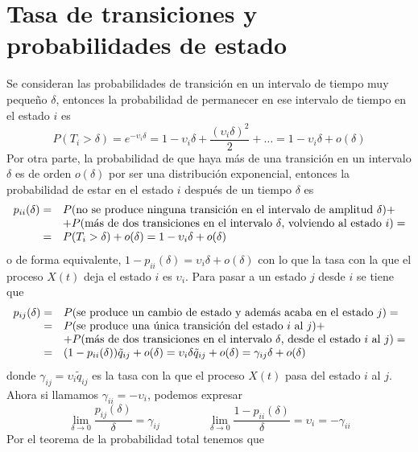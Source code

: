 \section{Tasa de transiciones y probabilidades de estado}
Se consideran las probabilidades de transici\'{o}n en un intervalo de
tiempo muy peque\~{n}o $\delta$, entonces la probabilidad de
permanecer en ese intervalo de tiempo en el estado $i$ es
\[
P(T_i>\delta)=e^{-\upsilon_i \delta}=1-\upsilon_i
\delta+\frac{(\upsilon_i \delta)^2}{2}+\ldots=1-\upsilon_i
\delta+o(\delta)
\]
Por otra parte, la probabilidad de que haya m\'{a}s de una transici\'{o}n
en un intervalo $\delta$ es de orden $o(\delta)$ por ser una
distribuci\'{o}n exponencial, entonces la probabilidad de estar en el
estado $i$ despu\'{e}s de un tiempo $\delta$ es
\[
\begin{array}{ll}
p_{ii}(\delta)=&P(\text{no se produce ninguna transici\'{o}n en el
intervalo de amplitud $\delta$})+\\
&+P(\text{m\'{a}s de dos transiciones en el intervalo $\delta$,
volviendo al estado $i$})=\\
\hfill=&P(T_i>\delta)+o(\delta)= 1-\upsilon_i\delta+o(\delta)
\end{array}
\]
o de forma equivalente,
$1-p_{ii}(\delta)=\upsilon_i\delta+o(\delta)$ con lo que la tasa
con la que el proceso $X(t)$ deja el estado $i$ es $\upsilon_i$.
Para pasar a un estado $j$ desde $i$ se tiene que
\[
\begin{array}{ll}
p_{ij}(\delta)=&P(\text{se produce un cambio de estado y adem\'{a}s
acaba en el estado $j$})=\\
\hfill=&P(\text{se produce una \'{u}nica transici\'{o}n del estado $i$ al
$j$})+\\
&+P(\text{m\'{a}s de dos transiciones en el intervalo $\delta$, desde
el estado $i$ al $j$})=\\
\hfill=&(1-p_{ii}(\delta))\tilde q_{ij}+o(\delta)=\upsilon_i\delta
\tilde q_{ij}+o(\delta)=\gamma_{ij}\delta+o(\delta)
\end{array}
\]
donde $\gamma_{ij}=\upsilon_i \tilde q_{ij}$ es la tasa con la
que el proceso $X(t)$ pasa del estado $i$ al $j$. Ahora si
llamamos $\gamma_{ii}=-\upsilon_i$, podemos expresar
\[
\displaystyle\lim_{\delta\to
0}\dfrac{p_{ij}(\delta)}{\delta}=\gamma_{ij} \hspace{50pt}
\displaystyle\lim_{\delta\to
0}\dfrac{1-p_{ii}(\delta)}{\delta}=\upsilon_i=-\gamma_{ii}
\]
Por el teorema de la probabilidad total tenemos que
